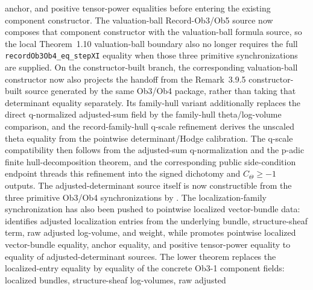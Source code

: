 \documentclass[11pt]{article}
\theoremstyle{plain}
\theoremstyle{definition}
\theoremstyle{remark}
\begin{document}
anchor, and positive tensor-power equalities before entering the existing
component constructor.  The valuation-ball Record-Ob3/Ob5 source now composes
that component constructor with the valuation-ball formula source, so the local
Theorem~1.10 valuation-ball boundary also no longer requires the full
\texttt{recordOb3Ob4\_eq\_stepXI} equality when those three primitive
synchronizations are supplied.  On the constructor-built branch, the
corresponding valuation-ball constructor now also projects the
\texttt{}
handoff from the Remark~3.9.5 constructor-built source generated by the same
Ob3/Ob4 package, rather than taking that determinant equality separately.
Its family-hull variant additionally replaces the direct q-normalized
adjusted-sum field by the family-hull theta/log-volume comparison, and the
record-family-hull q-scale refinement derives the unscaled theta equality from
the pointwise determinant/Hodge calibration.  The q-scale compatibility then
follows from the adjusted-sum q-normalization and the p-adic finite
hull-decomposition theorem, and the corresponding public side-condition
endpoint threads this refinement into the signed dichotomy and
\(C_\Theta\geq -1\) outputs.
The adjusted-determinant source itself is now constructible from the three
primitive Ob3/Ob4 synchronizations by
\texttt{}.
The localization-family synchronization has also been pushed to pointwise
localized vector-bundle data:
\texttt{}
identifies adjusted localization entries from the underlying bundle,
structure-sheaf term, raw adjusted log-volume, and weight, while
\texttt{}
promotes pointwise localized vector-bundle equality, anchor equality, and
positive tensor-power equality to equality of adjusted-determinant sources.
The lower theorem
\texttt{}
replaces the localized-entry equality by equality of the concrete Ob3-1
component fields: localized bundles, structure-sheaf log-volumes, raw adjusted
\end{document}
